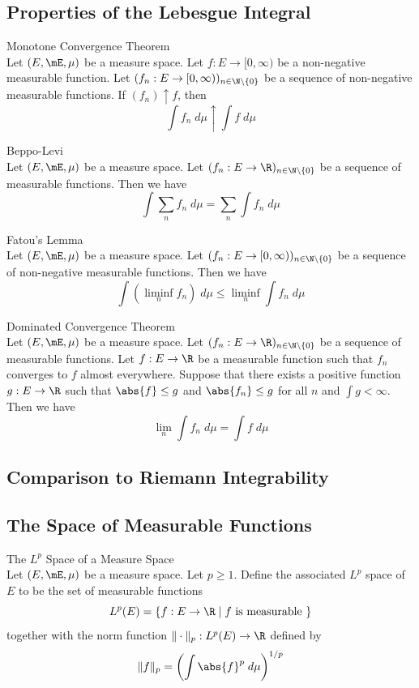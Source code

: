 \documentclass[a4paper]{article}
\begin{document}
\subsection{Properties of the Lebesgue Integral}
\begin{thm}{Monotone Convergence Theorem}{}\\
Let $(E,\mE,\mu)$ be a measure space. Let $f:E\to[0,\infty)$ be a non-negative measurable function. Let $(f_n:E\to[0,\infty))_{n\in\N\setminus\{0\}}$ be a sequence of non-negative measurable functions. If $(f_n)\uparrow f$, then $$\int f_n\;d\mu\uparrow\int f\;d\mu$$
\end{thm}

\begin{prp}{Beppo-Levi}{}\\
Let $(E,\mE,\mu)$ be a measure space. Let $(f_n:E\to\R)_{n\in\N\setminus\{0\}}$ be a sequence of measurable functions. Then we have $$\int\sum_nf_n\;d\mu=\sum_n\int f_n\;d\mu$$
\end{prp}

\begin{thm}{Fatou's Lemma}{}\\
Let $(E,\mE,\mu)$ be a measure space. Let $(f_n:E\to[0,\infty))_{n\in\N\setminus\{0\}}$ be a sequence of non-negative measurable functions. Then we have $$\int\left(\liminf_nf_n\right)\;d\mu\leq\liminf_n\int f_n\;d\mu$$
\end{thm}

\begin{thm}{Dominated Convergence Theorem}{}\\
Let $(E,\mE,\mu)$ be a measure space. Let $(f_n:E\to\R)_{n\in\N\setminus\{0\}}$ be a sequence of measurable functions. Let $f:E\to\R$ be a measurable function such that $f_n$ converges to $f$ almost everywhere. Suppose that there exists a positive function $g:E\to\R$ such that $\abs{f}\leq g$ and $\abs{f_n}\leq g$ for all $n$ and $\int g<\infty$. Then we have $$\lim_n\int f_n\;d\mu=\int f\;d\mu$$
\end{thm}

\subsection{Comparison to Riemann Integrability}

\subsection{The Space of Measurable Functions}
\begin{defn}{The $L^p$ Space of a Measure Space}{}\\
Let $(E,\mE,\mu)$ be a measure space. Let $p\geq 1$. Define the associated $L^p$ space of $E$ to be the set of measurable functions $$L^p(E)=\{f:E\to\R\;|\;f\text{ is measurable }\}$$ together with the norm function $\|\cdot\|_p:L^p(E)\to\R$ defined by $$\|f\|_p=\left(\int\abs{f}^p\;d\mu\right)^{1/p}$$
\end{defn}
\end{document}

